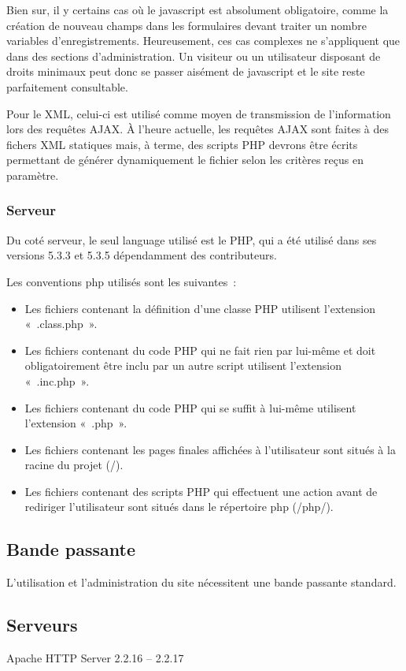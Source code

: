 \documentclass[letter, 10pt]{report}
\begin{document}
Bien sur, il y certains cas où le javascript est absolument obligatoire, comme la création de nouveau champs dans les formulaires devant traiter un nombre variables d'enregistrements. Heureusement, ces cas complexes ne s'appliquent que dans des sections d'administration. Un visiteur ou un utilisateur disposant de droits minimaux peut donc se passer aisément de javascript et le site reste parfaitement consultable.

Pour le XML, celui-ci est utilisé comme moyen de transmission de l'information lors des requêtes AJAX. À l'heure actuelle, les requêtes AJAX sont faites à des fichers XML statiques mais, à terme, des scripts PHP devrons être écrits permettant de générer dynamiquement le fichier selon les critères reçus en paramètre.

\subsubsection{Serveur}
Du coté serveur, le seul language utilisé est le PHP, qui a été utilisé dans ses versions 5.3.3 et 5.3.5 dépendamment des contributeurs.

Les conventions php utilisés sont les suivantes~:

\begin{itemize}
\item Les fichiers contenant la définition d'une classe PHP utilisent l'extension «~.class.php~».
\item Les fichiers contenant du code PHP qui ne fait rien par lui-même et doit obligatoirement être inclu par un autre script utilisent l'extension «~.inc.php~».
\item Les fichiers contenant du code PHP qui se suffit à lui-même utilisent l'extension «~.php~».
\item Les fichiers contenant les pages finales affichées à l'utilisateur sont situés à la racine du projet (/).
\item Les fichiers contenant des scripts PHP qui effectuent une action avant de rediriger l'utilisateur sont situés dans le répertoire php (/php/).
\end{itemize}

\subsection{Bande passante}
L'utilisation et l'administration du site nécessitent une bande passante standard.

\subsection{Serveurs}
Apache HTTP Server 2.2.16 -- 2.2.17
\end{document}
